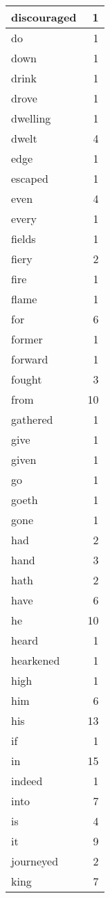 \begin{center}
\begin{longtable}{l|r}
discouraged & 1 \\ \hline
do & 1 \\ \hline
down & 1 \\ \hline
drink & 1 \\ \hline
drove & 1 \\ \hline
dwelling & 1 \\ \hline
dwelt & 4 \\ \hline
edge & 1 \\ \hline
escaped & 1 \\ \hline
even & 4 \\ \hline
every & 1 \\ \hline
fields & 1 \\ \hline
fiery & 2 \\ \hline
fire & 1 \\ \hline
flame & 1 \\ \hline
for & 6 \\ \hline
former & 1 \\ \hline
forward & 1 \\ \hline
fought & 3 \\ \hline
from & 10 \\ \hline
gathered & 1 \\ \hline
give & 1 \\ \hline
given & 1 \\ \hline
go & 1 \\ \hline
goeth & 1 \\ \hline
gone & 1 \\ \hline
had & 2 \\ \hline
hand & 3 \\ \hline
hath & 2 \\ \hline
have & 6 \\ \hline
he & 10 \\ \hline
heard & 1 \\ \hline
hearkened & 1 \\ \hline
high & 1 \\ \hline
him & 6 \\ \hline
his & 13 \\ \hline
if & 1 \\ \hline
in & 15 \\ \hline
indeed & 1 \\ \hline
into & 7 \\ \hline
is & 4 \\ \hline
it & 9 \\ \hline
journeyed & 2 \\ \hline
king & 7 \\ \hline

\end{longtable}
\end{center}
